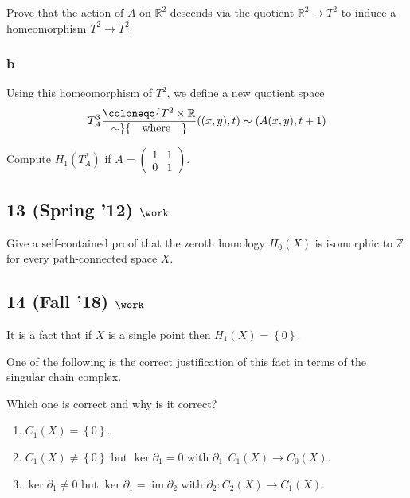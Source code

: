 Prove that the action of \(A\) on \({\mathbb{R}}^2\) descends via the
quotient \({\mathbb{R}}^2 \to T^2\) to induce a homeomorphism
\(T^2 \to T^2\).

\hypertarget{b-21}{%
\subsubsection{b}\label{b-21}}

Using this homeomorphism of \(T^2\), we define a new quotient space
\begin{align*}
T_A^3 \coloneqq{T^2\times{\mathbb{R}}\over \sim} {\quad \operatorname{where} \quad} ((x, y), t) \sim (A(x, y), t + 1)
\end{align*}

Compute \(H_1 (T_A^3 )\) if
\(A=\left(\begin{array}{ll} 1 & 1 \\ 0 & 1 \end{array}\right).\)

\hypertarget{spring-12-work-1}{%
\subsection{\texorpdfstring{13 (Spring '12)
\(\work\)}{13 (Spring '12) \textbackslash work}}\label{spring-12-work-1}}

Give a self-contained proof that the zeroth homology \(H_0 (X)\) is
isomorphic to \({\mathbb{Z}}\) for every path-connected space \(X\).

\hypertarget{fall-18-work-4}{%
\subsection{\texorpdfstring{14 (Fall '18)
\(\work\)}{14 (Fall '18) \textbackslash work}}\label{fall-18-work-4}}

It is a fact that if \(X\) is a single point then
\(H_1 (X) = \left\{{0}\right\}\).

One of the following is the correct justification of this fact in terms
of the singular chain complex.

Which one is correct and why is it correct?

\begin{enumerate}
\def\labelenumi{\alph{enumi}.}
\item
  \(C_1 (X) = \left\{{0}\right\}\).
\item
  \(C_1 (X) \neq \left\{{0}\right\}\) but \(\ker \partial_1 = 0\) with
  \(\partial_1 : C_1 (X) \to C_0 (X)\).
\item
  \(\ker \partial_1 \neq 0\) but
  \(\ker \partial_1 = \operatorname{im}\partial_2\) with
  \(\partial_2 : C_2 (X) \to C_1 (X)\).
\end{enumerate}

